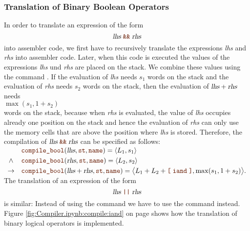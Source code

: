 \subsubsection{Translation of Binary Boolean Operators}
In order to translate an expression of the form
\[ \textsl{lhs} \;\mytt{\&\&}\; \textsl{rhs} \]
into assembler code, we first have to recursively translate the expressions \textsl{lhs} and
\textsl{rhs} into assembler code.  Later, when this code is executed the values of the expressions
\textsl{lhs} und \textsl{rhs} are placed on the stack.  We combine these values using the command .
If the evaluation of \textsl{lhs} needs $s_1$ words on the stack and the evaluation of \textsl{rhs} needs $s_2$
words on the stack, then the evaluation of $\textsl{lhs} + \textsl{rhs}$ needs 
\\[0.2cm]
\hspace*{1.3cm}
$\max(s_1, 1 + s_2)$
\\[0.2cm]
words on the stack, because when \textsl{rhs} is evaluated, the value of \textsl{lhs} occupies already one position
on the stack and hence the evaluation of \textsl{rhs} can only use the memory cells that are above the position
where \textsl{lhs} is stored. Therefore, the compilation of $\textsl{lhs} \;\mytt{\&\&}\; \textsl{rhs}$ can be
specified as follows:
\\[0.2cm]
\hspace*{1.3cm}
$
\begin{array}[t]{cll}
        & \mytt{compile\_bool}(\textsl{lhs}, \mytt{st}, \mytt{name}) = \pair(L_1, s_1)  \\[0.1cm]
\wedge  & \mytt{compile\_bool}(\textsl{rhs}, \mytt{st}, \mytt{name}) = \pair(L_2, s_2)  \\[0.1cm]
\rightarrow & \mytt{compile\_bool}(\textsl{lhs} + \textsl{rhs}, \mytt{st}, \mytt{name}) = 
            \bigl\langle L_1 + L_2 + \mytt{[}\; \mytt{iand} \;\mytt{]}, \max(s_1, 1+s_2) \bigr\rangle.
\end{array}$
\\[0.2cm]
The translation of an expression of the form
\[ \textsl{lhs} \;\mytt{||}\; \textsl{rhs} \]
is similar:  Instead of using the command  we have to use the command  instead.
Figure \ref{fig:Compiler.ipynb:compile:iand} on page \pageref{fig:Compiler.ipynb:compile:iand} shows how the
translation of binary logical operators is implemented.

